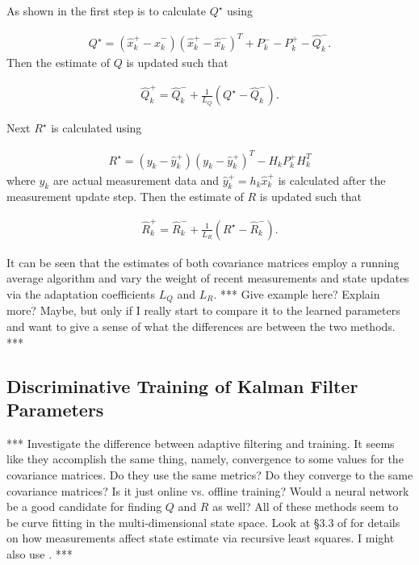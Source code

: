 As shown in \cite{Busse03adaptiveEKF} the first step is to calculate $Q^\star$ using

\begin{align*}
Q^\star = \left(\hat{x}_k^+-\hat{x}_k^-\right)\left(\hat{x}_k^+-\hat{x}_k^-\right)^T + P_k^- - P_k^+ - \hat{Q}_k^-.
\end{align*}
Then the estimate of $Q$ is updated such that

\begin{align}
\label{eq:qadapt}
\hat{Q}_k^+ = \hat{Q}_k^- + \frac{1}{L_Q}\left(Q^\star-\hat{Q}_k^-\right).
\end{align}

Next $R^\star$ is calculated using

\begin{align*}
R^\star = \left(y_k-\hat{y}_k^+\right)\left(y_k-\hat{y}_k^+\right)^T - H_kP_k^+H_k^T
\end{align*}
where $y_k$ are actual measurement data and $\hat{y}_k^+ = h_k\hat{x}_k^+$ is calculated after the measurement update step. Then the estimate of $R$ is updated such that

\begin{align}
\label{eq:radapt}
\hat{R}_k^+ = \hat{R}_k^- + \frac{1}{L_R}\left(R^\star-\hat{R}_k^-\right).
\end{align}

It can be seen that the estimates of both covariance matrices employ a running average algorithm and vary the weight of recent measurements and state updates via the adaptation coefficients $L_Q$ and $L_R$. *** Give example here? Explain more? Maybe, but only if I really start to compare it to the learned parameters and want to give a sense of what the differences are between the two methods. ***

\subsection{Discriminative Training of Kalman Filter Parameters}
\label{sec:trainingkfparams}
*** Investigate the difference between adaptive filtering and training. It seems like they accomplish the same thing, namely, convergence to some values for the covariance matrices. Do they use the same metrics? Do they converge to the same covariance matrices? Is it just online vs. offline training? Would a neural network be a good candidate for finding $Q$ and $R$ as well? All of these methods seem to be curve fitting in the multi-dimensional state space. Look at \S3.3 of \cite{Simon06OptimalEstimation} for details on how measurements affect state estimate via recursive least squares. I might also use \cite{Orderud05}. ***

